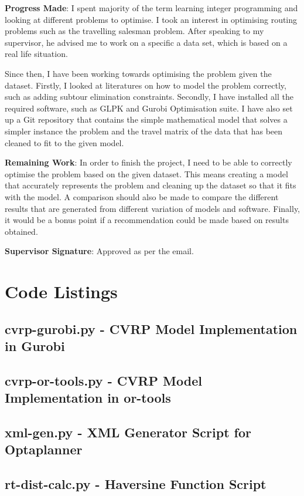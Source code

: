 \textbf{Progress Made}: I spent majority of the term learning integer programming and looking at different problems to optimise.
I took an interest in optimising routing problems such as the travelling salesman problem. After speaking to my supervisor,
 he advised me to work on a specific a data set, which is based on a real life situation.

Since then, I have been working towards optimising the problem given the dataset. Firstly, I looked at literatures on
how to model the problem correctly, such as adding subtour elimination constraints. Secondly, I have installed all the
required software, such as GLPK and Gurobi Optimisation suite. I have also set up a Git repository that contains the
simple mathematical model that solves a simpler instance the problem and the travel matrix of the data that has been
cleaned to fit to the given model.

\textbf{Remaining Work}: In order to finish the project, I need to be able to correctly optimise the problem based on the given
dataset. This means creating a model that accurately represents the problem and cleaning up the dataset so that it fits
with the model. A comparison should also be made to compare the different results that are generated from different
variation of models and software. Finally, it would be a bonus point if a recommendation could be made based on
results obtained.

\textbf{Supervisor Signature}:  Approved as per the email.


\chapter{Code Listings}

\section{cvrp-gurobi.py - CVRP Model Implementation in Gurobi}


\section{cvrp-or-tools.py - CVRP Model Implementation in or-tools}


\section{xml-gen.py - XML Generator Script for Optaplanner}


\section{rt-dist-calc.py - Haversine Function Script}

